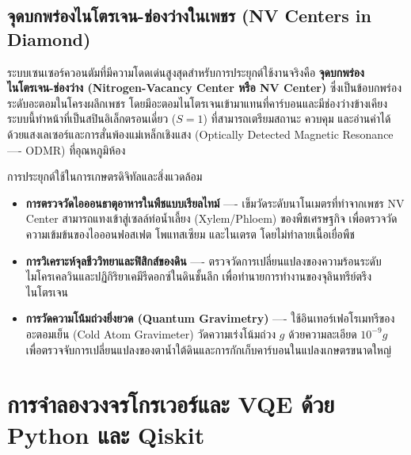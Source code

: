\subsection{จุดบกพร่องไนโตรเจน-ช่องว่างในเพชร (NV Centers in Diamond)}
ระบบเซนเซอร์ควอนตัมที่มีความโดดเด่นสูงสุดสำหรับการประยุกต์ใช้งานจริงคือ \textbf{จุดบกพร่องไนโตรเจน-ช่องว่าง (Nitrogen-Vacancy Center หรือ NV Center)} ซึ่งเป็นข้อบกพร่องระดับอะตอมในโครงผลึกเพชร โดยมีอะตอมไนโตรเจนเข้ามาแทนที่คาร์บอนและมีช่องว่างข้างเคียง ระบบนี้ทำหน้าที่เป็นสปินอิเล็กตรอนเดี่ยว ($S=1$) ที่สามารถเตรียมสถานะ ควบคุม และอ่านค่าได้ด้วยแสงเลเซอร์และการสั่นพ้องแม่เหล็กเชิงแสง (Optically Detected Magnetic Resonance ---- ODMR) ที่อุณหภูมิห้อง

การประยุกต์ใช้ในการเกษตรดิจิทัลและสิ่งแวดล้อม
\begin{itemize}
    \item \textbf{การตรวจวัดไอออนธาตุอาหารในพืชแบบเรียลไทม์} ---- เข็มวัดระดับนาโนเมตรที่ทำจากเพชร NV Center สามารถแทงเข้าสู่เซลล์ท่อน้ำเลี้ยง (Xylem/Phloem) ของพืชเศรษฐกิจ เพื่อตรวจวัดความเข้มข้นของไอออนฟอสเฟต โพแทสเซียม และไนเตรต โดยไม่ทำลายเนื้อเยื่อพืช
    \item \textbf{การวิเคราะห์จุลชีววิทยาและฟิสิกส์ของดิน} ---- ตรวจวัดการเปลี่ยนแปลงของความร้อนระดับไมโครเคลวินและปฏิกิริยาเคมีรีดอกซ์ในดินชั้นลึก เพื่อทำนายการทำงานของจุลินทรีย์ตรึงไนโตรเจน
    \item \textbf{การวัดความโน้มถ่วงยิ่งยวด (Quantum Gravimetry)} ---- ใช้อินเทอร์เฟอโรเมทรีของอะตอมเย็น (Cold Atom Gravimeter) วัดความเร่งโน้มถ่วง $g$ ด้วยความละเอียด $10^{-9} g$ เพื่อตรวจจับการเปลี่ยนแปลงของตาน้ำใต้ดินและการกักเก็บคาร์บอนในแปลงเกษตรขนาดใหญ่
\end{itemize}

\section{การจำลองวงจรโกรเวอร์และ VQE ด้วย Python และ Qiskit}

